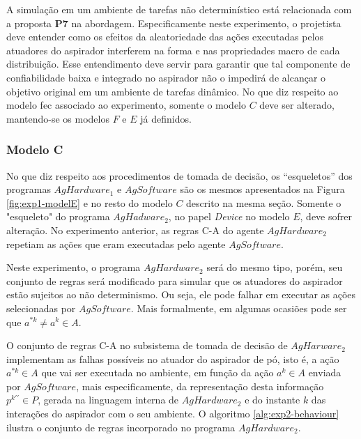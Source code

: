A simulação em um ambiente de tarefas não determinístico está relacionada com a proposta \textbf{P7} na abordagem. Especificamente neste experimento, o projetista deve entender como os efeitos da aleatoriedade das ações executadas pelos atuadores do aspirador interferem na forma e nas propriedades macro de cada distribuição. Esse entendimento deve servir para garantir que tal componente de confiabilidade baixa e integrado no aspirador não o impedirá de alcançar o objetivo original em um ambiente de tarefas dinâmico. No que diz respeito ao modelo \acrshort{fec} associado ao experimento, somente o modelo $C$ deve ser alterado, mantendo-se os modelos $F$ e $E$ já definidos.

\subsubsection{Modelo C}

No que diz respeito aos procedimentos de tomada de decisão, os “esqueletos” dos programas $AgHardware_1$ e $AgSoftware$ são os mesmos apresentados na Figura \ref{fig:exp1-modelE}  e no resto do modelo $C$ descrito na mesma seção. Somente o "esqueleto" do programa $AgHadware_2$, no papel \textit{Device} no modelo $E$, deve sofrer alteração. No experimento anterior, as regras C-A do agente $AgHardware_2$ repetiam as ações que eram executadas pelo agente $AgSoftware$.

Neste experimento, o programa $AgHardware_2$ será do mesmo tipo, porém, seu conjunto de regras será modificado para simular que os atuadores do aspirador estão sujeitos ao não determinismo. Ou seja, ele pode falhar em executar as ações selecionadas por $AgSoftware$. Mais formalmente, em algumas ocasiões pode ser que $a^{*k} \neq a^k \in A$. 

O conjunto de regras C-A no subsistema de tomada de decisão de $AgHarware_2$ implementam as falhas possíveis no atuador do aspirador de pó, isto é, a ação $a^{*k} \in A$ que vai ser executada no ambiente, em função da ação $a^k \in A$ enviada por $AgSoftware$, mais especificamente, da representação desta informação $p^{k\prime\prime} \in P$, gerada na linguagem interna de $AgHardware_2$ e do instante $k$ das interações do aspirador com o seu ambiente. O algoritmo \ref{alg:exp2-behaviour} ilustra o conjunto de regras incorporado no programa $AgHardware_2$.


